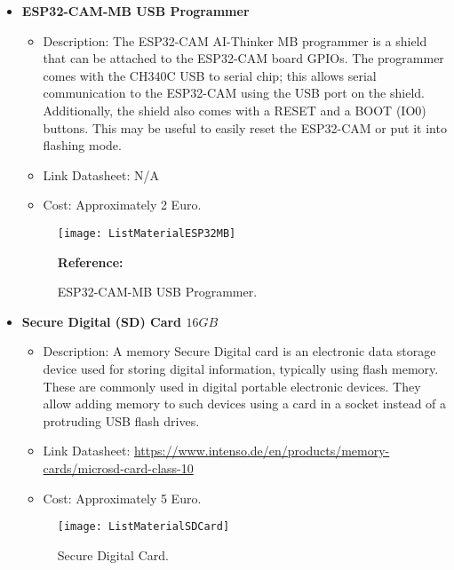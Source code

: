 \begin{itemize}
	\item \textbf{ESP32-CAM-MB USB Programmer} \\
	\begin{itemize}
		\item Description: The ESP32-CAM AI-Thinker MB programmer is a shield that can be attached to the ESP32-CAM board GPIOs. The programmer comes with the CH340C USB to serial chip; this allows serial communication to the ESP32-CAM using the USB port on the shield. Additionally, the shield also comes with a RESET and a BOOT (IO0) buttons. This may be useful to easily reset the ESP32-CAM or put it into flashing mode.
		\item Link Datasheet: N/A
		\item Cost: Approximately 2 Euro.
	\end{itemize}
	\begin{figure}  [H]
		\begin{center}
			\texttt{[image: ListMaterialESP32MB]}
			\caption{ESP32-CAM-MB USB Programmer.} 
			\label{fig:ESP32-CAM-MB USB Programmer.}
			\footnotesize \textbf{Reference:} \autocite{Amazon:2022}
		\end{center}
	\end{figure}	

	\item \textbf{Secure Digital (SD) Card \(16 GB\)} \\
	\begin{itemize}
		\item Description: A memory Secure Digital card is an electronic data storage device used for storing digital information, typically using flash memory. These are commonly used in digital portable electronic devices. They allow adding memory to such devices using a card in a socket instead of a protruding USB flash drives.
		\item Link Datasheet: \url{https://www.intenso.de/en/products/memory-cards/microsd-card-class-10}
		\item Cost: Approximately 5 Euro.
	\end{itemize}
	\begin{figure}  [H]
		\begin{center}
			\texttt{[image: ListMaterialSDCard]}
			\caption{Secure Digital Card.} 
			\label{fig:Secure Digital Card.}
		\end{center}
	\end{figure}	


\end{itemize}
